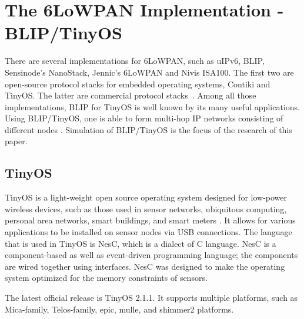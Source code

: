 \chapter{The 6LoWPAN Implementation - BLIP/TinyOS}
\label{Blip/TinyOS}
There are several implementations for 6LoWPAN, such as uIPv6, BLIP, Sensinode's NanoStack, Jennic's 6LoWPAN and Nivis ISA100. The first two are open-source protocol stacks
for embedded operating systems, Contiki and TinyOS. The latter are commercial protocol
stacks~\cite{ShelbyBormann2009}. Among all those implementations, BLIP for TinyOS is well known by its many useful applications. Using BLIP/TinyOS, one is able to form multi-hop IP networks consisting of different nodes \cite{BLIP}. Simulation of BLIP/TinyOS is the focus of the research of this paper.

\section{TinyOS}
\label{TinyOS}
TinyOS is a light-weight open source operating system designed for low-power wireless devices, such as those used in sensor networks, ubiquitous computing, personal area networks, smart buildings, and smart meters \cite{TinyOS}. It allows for various applications to be installed on sensor nodes via USB connections. The language that is used in TinyOS is NesC, which is a dialect of C language. NesC is a component-based as well as event-driven programming language; the components are wired together using interfaces. NesC was designed to make the operating system optimized for the memory constraints of sensors.
\newline

The latest official release is TinyOS 2.1.1. It supports multiple platforms, such as Mica-family, Telos-family, epic, mulle, and shimmer2 platforms. 

